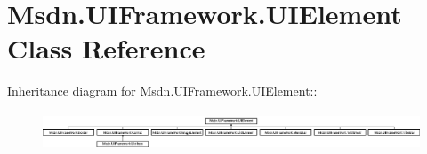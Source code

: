 \hypertarget{class_msdn_1_1_u_i_framework_1_1_u_i_element}{
\section{Msdn.UIFramework.UIElement Class Reference}
\label{class_msdn_1_1_u_i_framework_1_1_u_i_element}
}
Inheritance diagram for Msdn.UIFramework.UIElement::\begin{figure}[H]
\begin{center}
\leavevmode
\includegraphics[height=1.14286cm]{class_msdn_1_1_u_i_framework_1_1_u_i_element}
\end{center}
\end{figure}
